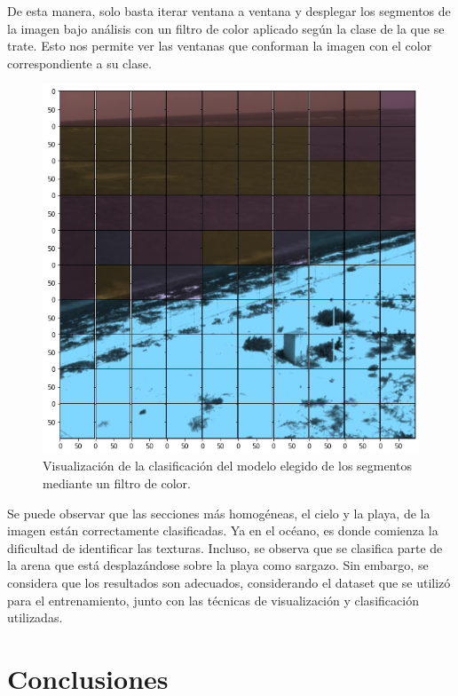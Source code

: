 \documentclass[conference]{IEEEtran}
\begin{document}
De esta manera, solo basta iterar ventana a ventana y desplegar los segmentos de la imagen bajo análisis con un filtro de color aplicado según la clase de la que se trate. Esto nos permite ver las ventanas que conforman la imagen con el color correspondiente a su clase.

\begin{figure}[H]
    \centering
    \includegraphics[scale=0.3]{imgs/masked.png}
    \caption{Visualización de la clasificación del modelo elegido de los segmentos mediante un filtro de color.}
\end{figure}

Se puede observar que las secciones más homogéneas, el cielo y la playa, de la imagen están correctamente clasificadas. Ya en el océano, es donde comienza la dificultad de identificar las texturas. Incluso, se observa que se clasifica parte de la arena que está desplazándose sobre la playa como sargazo. Sin embargo, se considera que los resultados son adecuados, considerando el dataset que se utilizó para el entrenamiento, junto con las técnicas de visualización y clasificación utilizadas.

\section{Conclusiones}
\end{document}

